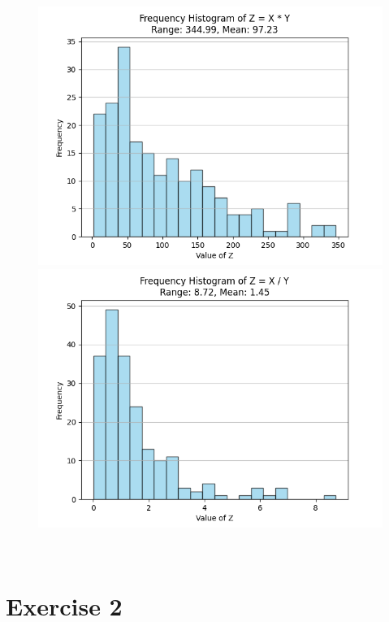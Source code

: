 \documentclass[a4paper,12pt]{article}
\begin{document}
\begin{figure}[h!]
    \centering
    \begin{minipage}{0.5\textwidth}
        \centering
        \includegraphics[width=\textwidth]{./Screenshots/Exercise1.7.1.png}
    \end{minipage}%
    \hfill
    \begin{minipage}{0.5\textwidth}
        \centering
        \includegraphics[width=\textwidth]{./Screenshots/Exercise1.7.2.png}
    \end{minipage}
\end{figure} \\

\newpage
\section{Exercise 2}
\end{document}
